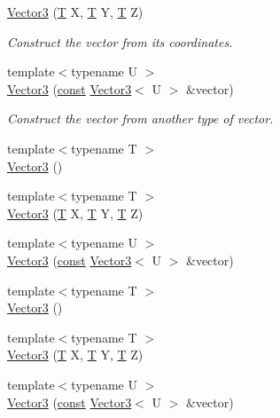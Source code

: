 \begin{DoxyCompactItemize}
\hyperlink{classsf_1_1_vector3_a99ed75b68f58adfa3e9fa0561b424bf6}{Vector3} (\hyperlink{curses_8priv_8h_a5ef253115820acf7d27f3c5c3b02a0f0}{T} X, \hyperlink{curses_8priv_8h_a5ef253115820acf7d27f3c5c3b02a0f0}{T} Y, \hyperlink{curses_8priv_8h_a5ef253115820acf7d27f3c5c3b02a0f0}{T} Z)
\begin{DoxyCompactList}\small\item\em Construct the vector from its coordinates. \end{DoxyCompactList}\item 
{\footnotesize template$<$typename U $>$ }\\\hyperlink{classsf_1_1_vector3_adb2b2e150025e97ccfa96219bbed59d1}{Vector3} (\hyperlink{term__entry_8h_a57bd63ce7f9a353488880e3de6692d5a}{const} \hyperlink{classsf_1_1_vector3}{Vector3}$<$ U $>$ \&vector)
\begin{DoxyCompactList}\small\item\em Construct the vector from another type of vector. \end{DoxyCompactList}\item 
{\footnotesize template$<$typename T $>$ }\\\hyperlink{classsf_1_1_vector3_a49536881e57dd6f1bec692bb85b39413}{Vector3} ()
\item 
{\footnotesize template$<$typename T $>$ }\\\hyperlink{classsf_1_1_vector3_a6d71676baa113af029006c01620fd4ca}{Vector3} (\hyperlink{curses_8priv_8h_a5ef253115820acf7d27f3c5c3b02a0f0}{T} X, \hyperlink{curses_8priv_8h_a5ef253115820acf7d27f3c5c3b02a0f0}{T} Y, \hyperlink{curses_8priv_8h_a5ef253115820acf7d27f3c5c3b02a0f0}{T} Z)
\item 
{\footnotesize template$<$typename U $>$ }\\\hyperlink{classsf_1_1_vector3_adb2b2e150025e97ccfa96219bbed59d1}{Vector3} (\hyperlink{term__entry_8h_a57bd63ce7f9a353488880e3de6692d5a}{const} \hyperlink{classsf_1_1_vector3}{Vector3}$<$ U $>$ \&vector)
\item 
{\footnotesize template$<$typename T $>$ }\\\hyperlink{classsf_1_1_vector3_a49536881e57dd6f1bec692bb85b39413}{Vector3} ()
\item 
{\footnotesize template$<$typename T $>$ }\\\hyperlink{classsf_1_1_vector3_a6d71676baa113af029006c01620fd4ca}{Vector3} (\hyperlink{curses_8priv_8h_a5ef253115820acf7d27f3c5c3b02a0f0}{T} X, \hyperlink{curses_8priv_8h_a5ef253115820acf7d27f3c5c3b02a0f0}{T} Y, \hyperlink{curses_8priv_8h_a5ef253115820acf7d27f3c5c3b02a0f0}{T} Z)
\item 
{\footnotesize template$<$typename U $>$ }\\\hyperlink{classsf_1_1_vector3_adb2b2e150025e97ccfa96219bbed59d1}{Vector3} (\hyperlink{term__entry_8h_a57bd63ce7f9a353488880e3de6692d5a}{const} \hyperlink{classsf_1_1_vector3}{Vector3}$<$ U $>$ \&vector)
\end{DoxyCompactItemize}
